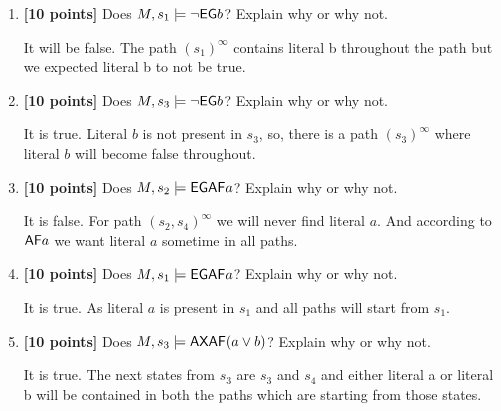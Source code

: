 \documentclass{article}
\begin{document}
\begin{enumerate}
\item \textbf{[10 points]} Does $M, s_1 \models \neg \mathord{\mathsf{E}}
  \mathord{\mathsf{G}} b$?  Explain why or why not.
  \begin{answer}
  It will be false. The path $(s_1)^\infty$ contains literal b throughout the path but we expected literal b to not be true.
  \end{answer}
  
\item \textbf{[10 points]} Does $M, s_3 \models \neg \mathord{\mathsf{E}}
  \mathord{\mathsf{G}} b$?  Explain why or why not.
  \begin{answer}
  It is true. Literal $b$ is not present in $s_3$, so, there is a path $(s_3)^\infty$ where literal $b$ will become false throughout.
  \end{answer}
  
\item \textbf{[10 points]} Does $M, s_2 \models \mathord{\mathsf{E}} \mathord{\mathsf{G}} \mathord{\mathsf{A}}
  \mathord{\mathsf{F}} a$?  Explain why or why not.
  \begin{answer}
  It is false. For path $(s_2,s_4)^\infty$ we will never find literal $a$. And according to $\mathord{\mathsf{A}} \mathord{\mathsf{F}} a$ we want literal $a$ sometime in all paths.
  \end{answer}

\item \textbf{[10 points]} Does $M, s_1 \models \mathord{\mathsf{E}} \mathord{\mathsf{G}} \mathord{\mathsf{A}}
  \mathord{\mathsf{F}} a$?  Explain why or why not.
  \begin{answer}
  It is true. As literal $a$ is present in $s_1$ and all paths will start from $s_1$.
  \end{answer}

\item \textbf{[10 points]} Does $M, s_3 \models \mathord{\mathsf{A}}
  \mathord{\mathsf{X}} \mathord{\mathsf{A}} \mathord{\mathsf{F}} (a \lor b)$?  Explain why or why not.
  \begin{answer}
  It is true. The next states from $s_3$ are $s_3$ and $s_4$ and either literal a or literal b will be contained in both the paths which are starting from those states.
  \end{answer}
\end{enumerate}
\end{document}
